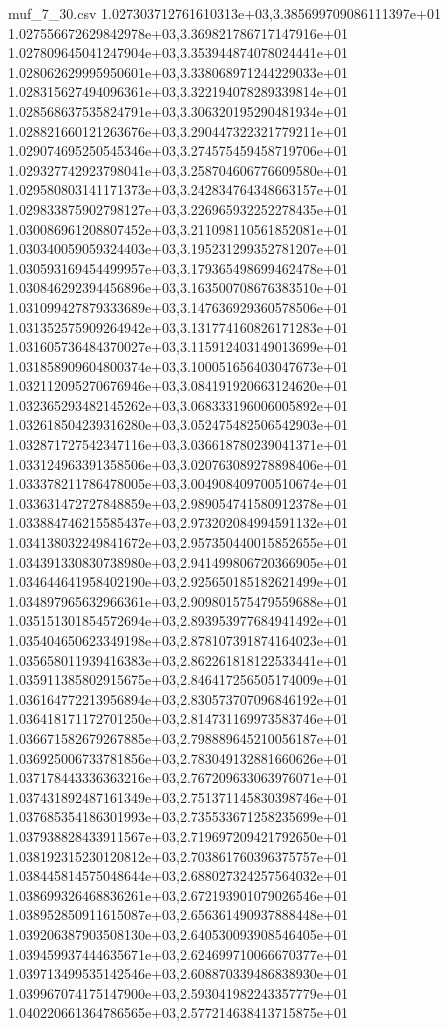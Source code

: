 \begin{filecontents*}{muf_7_30.csv}
1.027303712761610313e+03,3.385699709086111397e+01
1.027556672629842978e+03,3.369821786717147916e+01
1.027809645041247904e+03,3.353944874078024441e+01
1.028062629995950601e+03,3.338068971244229033e+01
1.028315627494096361e+03,3.322194078289339814e+01
1.028568637535824791e+03,3.306320195290481934e+01
1.028821660121263676e+03,3.290447322321779211e+01
1.029074695250545346e+03,3.274575459458719706e+01
1.029327742923798041e+03,3.258704606776609580e+01
1.029580803141171373e+03,3.242834764348663157e+01
1.029833875902798127e+03,3.226965932252278435e+01
1.030086961208807452e+03,3.211098110561852081e+01
1.030340059059324403e+03,3.195231299352781207e+01
1.030593169454499957e+03,3.179365498699462478e+01
1.030846292394456896e+03,3.163500708676383510e+01
1.031099427879333689e+03,3.147636929360578506e+01
1.031352575909264942e+03,3.131774160826171283e+01
1.031605736484370027e+03,3.115912403149013699e+01
1.031858909604800374e+03,3.100051656403047673e+01
1.032112095270676946e+03,3.084191920663124620e+01
1.032365293482145262e+03,3.068333196006005892e+01
1.032618504239316280e+03,3.052475482506542903e+01
1.032871727542347116e+03,3.036618780239041371e+01
1.033124963391358506e+03,3.020763089278898406e+01
1.033378211786478005e+03,3.004908409700510674e+01
1.033631472727848859e+03,2.989054741580912378e+01
1.033884746215585437e+03,2.973202084994591132e+01
1.034138032249841672e+03,2.957350440015852655e+01
1.034391330830738980e+03,2.941499806720366905e+01
1.034644641958402190e+03,2.925650185182621499e+01
1.034897965632966361e+03,2.909801575479559688e+01
1.035151301854572694e+03,2.893953977684941492e+01
1.035404650623349198e+03,2.878107391874164023e+01
1.035658011939416383e+03,2.862261818122533441e+01
1.035911385802915675e+03,2.846417256505174009e+01
1.036164772213956894e+03,2.830573707096846192e+01
1.036418171172701250e+03,2.814731169973583746e+01
1.036671582679267885e+03,2.798889645210056187e+01
1.036925006733781856e+03,2.783049132881660626e+01
1.037178443336363216e+03,2.767209633063976071e+01
1.037431892487161349e+03,2.751371145830398746e+01
1.037685354186301993e+03,2.735533671258235699e+01
1.037938828433911567e+03,2.719697209421792650e+01
1.038192315230120812e+03,2.703861760396375757e+01
1.038445814575048644e+03,2.688027324257564032e+01
1.038699326468836261e+03,2.672193901079026546e+01
1.038952850911615087e+03,2.656361490937888448e+01
1.039206387903508130e+03,2.640530093908546405e+01
1.039459937444635671e+03,2.624699710066670377e+01
1.039713499535142546e+03,2.608870339486838930e+01
1.039967074175147900e+03,2.593041982243357779e+01
1.040220661364786565e+03,2.577214638413715875e+01

\end{filecontents*}
